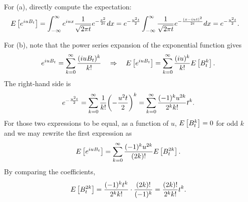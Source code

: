 \begin{solution}
    For (a), directly compute the expectation:
    \begin{equation*}
        \begin{split}
            E\left[ {e^{iuB_t}} \right] &= \int_{-\infty}^\infty e^{iux}\frac{1}{\sqrt{2\pi t}}e^{-\frac{x^2}{2t}}dx 
            = e^{-\frac{u^2t}{2}}\int_{-\infty}^\infty \frac{1}{\sqrt{2\pi t}}e^{-\frac{(x - iut)^2}{2t}}dx
            = e^{-\frac{u^2t}{2}}. 
        \end{split}
    \end{equation*}

    For (b), note that the power series expansion of the exponential function 
    gives 
    \begin{equation*}
        e^{iuB_t} = \sum_{k=0}^\infty \frac{(iuB_t)^k}{k!} 
        \quad\Rightarrow\quad
        E\left[ {e^{iuB_t}} \right] = \sum_{k=0}^\infty \frac{(iu)^k}{k!} E\left[ {B_t^k} \right].
    \end{equation*}
    The right-hand side is 
    \begin{equation*}
        e^{-\frac{u^2t}{2}} = \sum_{k=0}^\infty \frac{1}{k!}\pth{-\frac{u^2t}{2}}^k 
        = \sum_{k=0}^\infty \frac{(-1)^{k}u^{2k}}{2^k k!} t^k.
    \end{equation*}
    For those two expressions to be equal, as a function of $u$, $E\left[ {B_t^k} \right] = 0$ 
    for odd $k$ and we may rewrite the first expression as 
    \begin{equation*}
        E\left[ {e^{iuB_t}} \right] = \sum_{k=0}^\infty \frac{(-1)^ku^{2k}}{(2k)!}E\left[ {B_t^{2k}} \right]. 
    \end{equation*}
    By comparing the coefficients, 
    \begin{equation*}
        E\left[ {B_t^{2k}} \right] = \frac{(-1)^kt^k}{2^k k!}\cdot\frac{(2k)!}{(-1)^k} 
        = \frac{(2k)!}{2^k k!}t^k.
    \end{equation*}


\end{solution}
